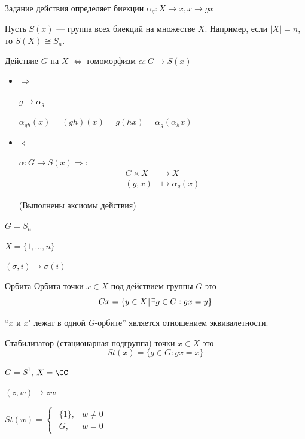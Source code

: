 Задание действия определяет биекции \( \alpha_g : X \to x, x \to gx \)

Пусть \( S(x) \) --- группа всех биекций на множестве \( X \).
Например, если \( |X| = n \), то \( S(X) \cong S_n \).

Действие \( G \) на \( X \) \( \Leftrightarrow \) гомоморфизм \( \alpha : G \to S(x) \)
\begin{itemize}
    \item
        \( \Rightarrow \)

        \( g \to \alpha_g \)

        \( \alpha_{gh} (x) = (gh) (x) = g(hx) = \alpha_g ( \alpha_h x ) \)
    \item
        \( \Leftarrow \)

        \( \alpha : G \to S(x) \Rightarrow \):
        \[
            \begin{aligned}
                G \times X &\to X
                \\
                (g, x) &\mapsto \alpha_g (x)
            \end{aligned}
        \]

        (Выполнены аксиомы действия)
\end{itemize}

\begin{example}{}{}
    \( G = S_n \)

    \( X = \{ 1, \ldots, n \} \)

    \( (\sigma, i) \to \sigma(i) \)
\end{example}

\begin{defn}{Орбита}{}
    Орбита точки \( x \in X \) под действием группы \( G \) это
    \[
        Gx = \{ y \in X \: \vline \: \exists g \in G : gx = y \}
    \]
\end{defn}

\begin{remark}{}{}
    ``\( x \) и \( x' \) лежат в одной \( G \)-орбите''
    является отношением эквивалетности.
\end{remark}

\begin{defn}{}{}
    Стабилизатор (стационарная подгруппа) точки \( x \in X \) это
    \[
        St(x) = \{ g \in G : gx = x \}
    \]
\end{defn}

\begin{example}{}{}
    \( G = S^1 \), \( X = \CC \)

    \( (z, w) \to zw \)

    \(
        St(w) = \begin{cases}
            \begin{aligned}
                \{ 1 \}, & w \neq 0
                \\
                G,       & w = 0
            \end{aligned}
        \end{cases}
    \)
\end{example}

